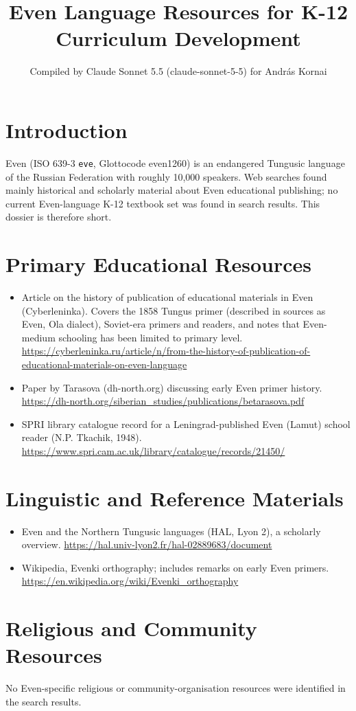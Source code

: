 \documentclass[12pt]{article}
\title{Even Language Resources for K-12 Curriculum Development}
\author{Compiled by Claude Sonnet 5.5 (claude-sonnet-5-5) for Andr\'as Kornai}
\date{}
\begin{document}
\maketitle
\section{Introduction}
Even (ISO 639-3 \texttt{eve}, Glottocode even1260) is an endangered Tungusic language of the Russian Federation with roughly 10,000 speakers. Web searches found mainly historical and scholarly material about Even educational publishing; no current Even-language K-12 textbook set was found in search results. This dossier is therefore short.
\section{Primary Educational Resources}
\begin{itemize}
\item Article on the history of publication of educational materials in Even (Cyberleninka). Covers the 1858 Tungus primer (described in sources as Even, Ola dialect), Soviet-era primers and readers, and notes that Even-medium schooling has been limited to primary level. \url{https://cyberleninka.ru/article/n/from-the-history-of-publication-of-educational-materials-on-even-language}
\item Paper by Tarasova (dh-north.org) discussing early Even primer history. \url{https://dh-north.org/siberian_studies/publications/betarasova.pdf}
\item SPRI library catalogue record for a Leningrad-published Even (Lamut) school reader (N.P. Tkachik, 1948). \url{https://www.spri.cam.ac.uk/library/catalogue/records/21450/}
\end{itemize}
\section{Linguistic and Reference Materials}
\begin{itemize}
\item Even and the Northern Tungusic languages (HAL, Lyon 2), a scholarly overview. \url{https://hal.univ-lyon2.fr/hal-02889683/document}
\item Wikipedia, Evenki orthography; includes remarks on early Even primers. \url{https://en.wikipedia.org/wiki/Evenki_orthography}
\end{itemize}
\section{Religious and Community Resources}
No Even-specific religious or community-organisation resources were identified in the search results.
\end{document}
